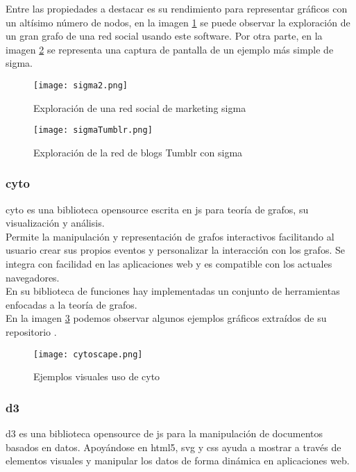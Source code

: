 Entre las propiedades a destacar es su rendimiento para representar gráficos con un altísimo número de nodos, en la imagen \ref{image:sigma2} se puede observar la exploración de un gran grafo de una red social usando este \gls{software}. Por otra parte, en la imagen  \ref{image:sigma} se representa una captura de pantalla de un ejemplo más simple de \gls{sigma}.

\begin{figure}[h!]
  \centering
    \texttt{[image: sigma2.png]}
  \caption{Exploración de una red social de marketing \gls{sigma} \cite{sigmaNodus}}
  \label{image:sigma2}
\end{figure}

\begin{figure}[h!]
  \centering
    \texttt{[image: sigmaTumblr.png]}
  \caption{Exploración de la red de blogs Tumblr con  \gls{sigma} \cite{sigmaNodus}}
  \label{image:sigma}
\end{figure}

\subsubsection{\gls{cyto}}
\Gls{cyto} es una biblioteca \gls{opensource} escrita en \gls{js} para teoría de grafos, su visualización y análisis.\\

Permite la manipulación y representación de grafos interactivos facilitando al usuario crear sus propios eventos y personalizar la interacción con los grafos. Se integra con facilidad en las aplicaciones web y es compatible con los actuales navegadores.\\

En su biblioteca de funciones hay implementadas un conjunto de herramientas enfocadas a la teoría de grafos.\\

En la imagen \ref{image:cyto} podemos observar algunos ejemplos gráficos extraídos de su repositorio \cite{cyto}.

\begin{figure}[h!]
  \centering
    \texttt{[image: cytoscape.png]}
  \caption{Ejemplos visuales uso de \gls{cyto} \cite{cyto}}
  \label{image:cyto}
\end{figure}


\subsubsection{\gls{d3}}
\Gls{d3} es una biblioteca \gls{opensource} de \gls{js} para la manipulación de documentos basados en datos. Apoyándose en \gls{html5}, \gls{svg} y \gls{css} ayuda a mostrar a través de elementos visuales y manipular los datos de forma dinámica en aplicaciones web.\\

